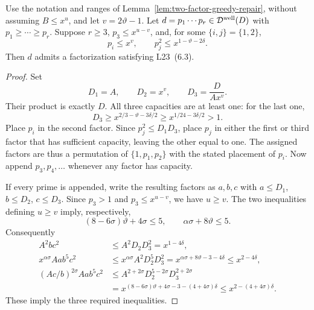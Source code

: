 \begin{lemma}
\label{lem:buffered-three-factor-greedy-repair}
Use the notation and ranges of
Lemma~\ref{lem:two-factor-greedy-repair}, without assuming
$B\le x^u$, and let $v=2\vartheta-1$.
Let $d=p_1\cdots p_r\in\mathcal D^{\rm well}(D)$ with
$p_1\ge\cdots\ge p_r$.
Suppose $r\ge3$, $p_3\le x^{u-v}$, and, for some
$\{i,j\}=\{1,2\}$,
\[
 p_i\le x^v,\qquad p_j^2\le x^{1-\vartheta-2\delta}.
\]
Then $d$ admits a factorization satisfying L23~(6.3).
\end{lemma}

\begin{proof}
Set
\[
 D_1=A,\qquad D_2=x^v,\qquad D_3=\frac{D}{Ax^v}.
\]
Their product is exactly $D$.  All three capacities are at least
one: for the last one,
\[
 D_3\ge x^{2/3-\vartheta-3\delta/2}
       \ge x^{1/24-3\delta/2}>1.
\]
Place $p_i$ in the second factor.  Since
$p_j^2\le D_1D_3$, place $p_j$ in either the first or third
factor that has sufficient capacity, leaving the other equal to
one.  The assigned factors are thus a permutation of
$\{1,p_1,p_2\}$ with the stated placement of $p_i$.
Now append $p_3,p_4,\ldots$ whenever any factor has capacity.

If every prime is appended, write the resulting factors as
$a,b,c$ with $a\le D_1$, $b\le D_2$, $c\le D_3$.
Since $p_3>1$ and $p_3\le x^{u-v}$, we have $u\ge v$.
The two inequalities defining $u\ge v$ imply, respectively,
\[
 (8-6\sigma)\vartheta+4\sigma\le5,
 \qquad \alpha\sigma+8\vartheta\le5.
\]
Consequently
\begin{align*}
 A^2bc^2
 &\le A^2D_2D_3^2
   =x^{1-4\delta},\\
 x^{\alpha\sigma}Aab^5c^2
 &\le x^{\alpha\sigma}A^2D_2^5D_3^2
   =x^{\alpha\sigma+8\vartheta-3-4\delta}
   \le x^{2-4\delta},\\
 (Ac/b)^{2\sigma}Aab^5c^2
 &\le A^{2+2\sigma}D_2^{5-2\sigma}D_3^{2+2\sigma}\\
 &=x^{(8-6\sigma)\vartheta+4\sigma-3-(4+4\sigma)\delta}
   \le x^{2-(4+4\sigma)\delta}.
\end{align*}
These imply the three required inequalities.


\end{proof}
